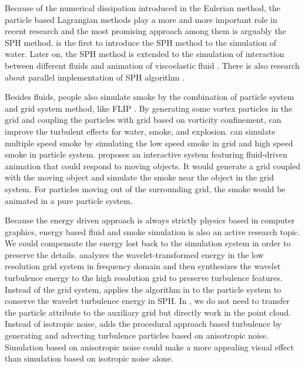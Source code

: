 Because of the numerical dissipation introduced in the Eulerian
method, the particle based Lagrangian methods play a more and more
important role in recent research and the most promising approach
among them is arguably the SPH method.
\cite{Muller:2003:PFS:846276.846298} is the first to introduce the SPH
method to the simulation of water. Later on, the SPH method is
extended to the simulation of interaction between different fluids
\cite{Muller:2005:PFI:1073368.1073402} and animation of viscoelastic
fluid \cite{Clavet:2005:PVF:1073368.1073400}.  There is also research
about parallel implementation of SPH algorithm
\cite{Harada_Koshizuka_Kawaguchi_2007}.

Besides fluids, people also simulate smoke by the combination of
particle system and grid system method, like FLIP
\cite{Zhu:2005:ASF:1073204.1073298}. By generating some vortex
particles in the grid and coupling the particles with grid based on
vorticity confinement, \cite{Selle:2005:VPM:1073204.1073282} can
improve the turbulent effects for water, smoke, and explosion.
\cite{CGF:CGF1562} can simulate multiple speed smoke by simulating the
low speed smoke in grid and high speed smoke in particle system.
\cite{Cohen:2010:IFS:1730804.1730807} proposes an interactive system
featuring fluid-driven animation that could respond to moving objects.
It would generate a grid coupled with the moving object and simulate
the smoke near the object in the grid system. For particles moving out
of the surrounding grid, the smoke would be animated in a pure
particle system.


Because the energy driven approach is always strictly physics based in
computer graphics, energy based fluid and smoke simulation is also an
active research topic. We could compensate the energy lost back to the
simulation system in order to preserve the details.
\cite{Kim:2008:WTF:1360612.1360649} analyzes the wavelet-transformed
energy in the low resolution grid system in frequency domain and then
synthesizes the wavelet turbulence energy to the high resolution grid
to preserve turbulence features. Instead of the grid system,
\cite{PG2011short:67-72:2011} applies the algorithm in
\cite{Kim:2008:WTF:1360612.1360649} to the particle system to conserve
the wavelet turbulence energy in SPH. In
\cite{Kim:2008:WTF:1360612.1360649}, we do not need to transfer the
particle attribute to the auxiliary grid but directly work in the
point cloud. Instead of isotropic noise,
\cite{Pfaff:2010:SFS:1882261.1866196} adds the procedural approach
based turbulence by generating and advecting turbulence particles
based on anisotropic noise. Simulation based on anisotropic noise
could make a more appealing visual effect than simulation based on
isotropic noise alone.

